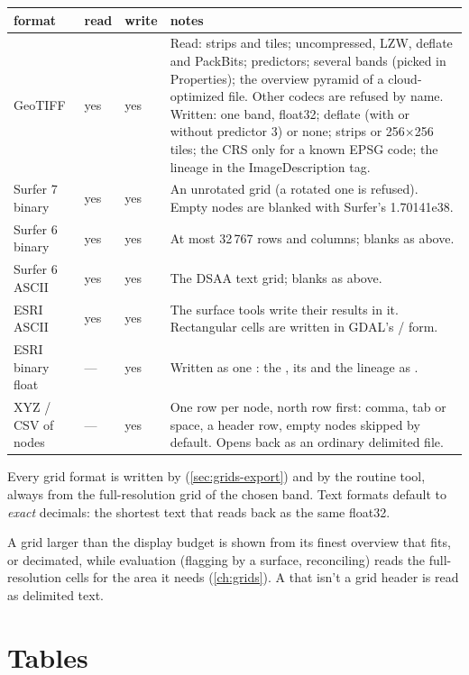 \begin{tabularx}{\linewidth}{@{}p{27mm}p{9mm}p{9mm}L@{}}
\toprule
format & read & write & notes \\
\midrule
GeoTIFF   & yes & yes & Read: strips and tiles; uncompressed, LZW, deflate
  and PackBits; predictors; several bands (picked in Properties); the overview pyramid of a
  cloud-optimized file. Other codecs are refused by name. Written: one band, float32; deflate
  (with or without predictor 3) or none; strips or 256×256 tiles; the CRS only for a known EPSG
  code; the lineage in the ImageDescription tag. \\
Surfer 7 binary  & yes & yes & An unrotated grid (a rotated one is refused). Empty
  nodes are blanked with Surfer's 1.70141e38. \\
Surfer 6 binary  & yes & yes & At most 32\,767 rows and columns; blanks as above. \\
Surfer 6 ASCII  & yes & yes & The DSAA text grid; blanks as above. \\
ESRI ASCII  & yes & yes & The surface tools write their results in it. Rectangular cells
  are written in GDAL's / form. \\
ESRI binary float  & — & yes & Written as one : the , its
   and the lineage as . \\
XYZ / CSV of nodes & — & yes & One row per node, north row first: comma, tab or space, a header
  row, empty nodes skipped by default. Opens back as an ordinary delimited file. \\
\bottomrule
\end{tabularx}

Every grid format is written by  (\cref{sec:grids-export}) and by the
 routine tool, always from the full-resolution grid of the chosen band. Text
formats default to \emph{exact} decimals: the shortest text that reads back as the same float32.

A grid larger than the display budget is shown from its finest overview that fits, or decimated,
while evaluation (flagging by a surface, reconciling) reads the full-resolution cells for the area
it needs (\cref{ch:grids}). A  that isn't a grid header is read as delimited text.

\section{Tables}\label{sec:formats-tables}

